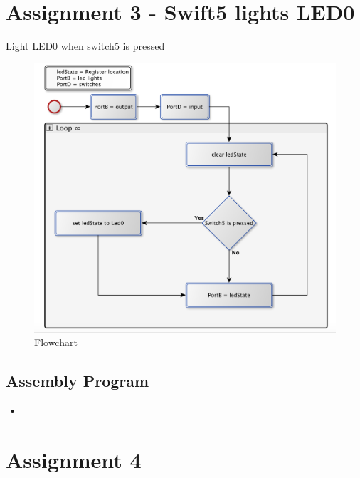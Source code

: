 \documentclass[a4paper, 12pt]{article}
\newcommand{\avrasm}[2]{
\begin{itemize}
\item[]
\end{itemize}
}
\begin{document}
\section{Assignment 3 - Swift5 lights LED0}
\begin{algorithm}
\begin{algorithmic}
\Repeat
{} 
\EndIf
{}
\Until{$\infty$}
\EndProcedure
\caption{Light LED0 when switch5 is pressed}
\label{assign2.pseudo}
\end{algorithmic}
\end{algorithm}

\begin{figure}[h]
\includegraphics[scale=0.5]{Flowchart_pics/assignment3_pic.png} 
\caption{Flowchart}
\label{}
\end{figure}
\newpage
\subsection{Assembly Program}
\avrasm{../src/a3.asm}{}
\newpage

\section{Assignment 4}
\begin{algorithm}
\begin{algorithmic}
\State{}
\EndProcedure
\caption{}
\label{}
\end{algorithmic}
\end{algorithm}
\end{document}
